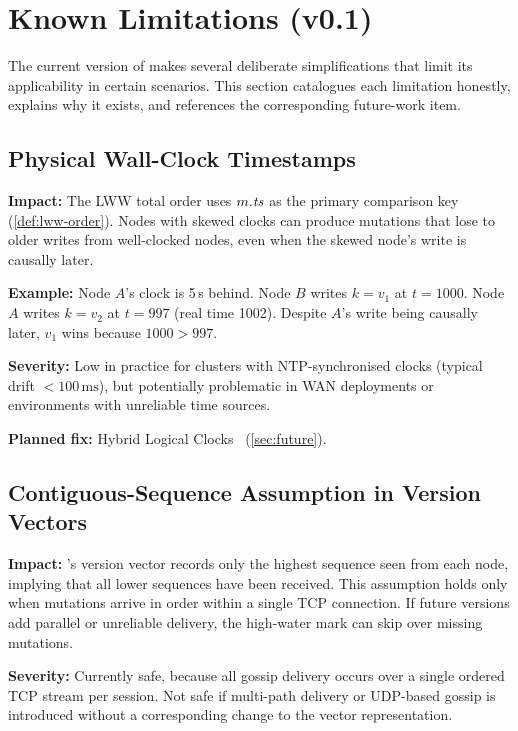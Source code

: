 \section{Known Limitations (v0.1)}
\label{sec:limitations}

The current version of \pebble{} makes several deliberate simplifications that
limit its applicability in certain scenarios. This section catalogues each
limitation honestly, explains why it exists, and references the corresponding
future-work item.

\subsection{Physical Wall-Clock Timestamps}

\textbf{Impact:} The LWW total order uses $m.\mathit{ts}$ as the primary comparison
key (\cref{def:lww-order}). Nodes with skewed clocks can produce mutations that
lose to older writes from well-clocked nodes, even when the skewed node's write
is causally later.

\textbf{Example:} Node $A$'s clock is 5\,s behind. Node $B$ writes $k = v_1$ at
$t = 1000$. Node $A$ writes $k = v_2$ at $t = 997$ (real time 1002). Despite
$A$'s write being causally later, $v_1$ wins because $1000 > 997$.

\textbf{Severity:} Low in practice for clusters with NTP-synchronised clocks
(typical drift $< 100\,\text{ms}$), but potentially problematic in WAN deployments
or environments with unreliable time sources.

\textbf{Planned fix:} Hybrid Logical Clocks~\cite{kulkarni2014hlc} (\cref{sec:future}).

\subsection{Contiguous-Sequence Assumption in Version Vectors}

\textbf{Impact:} \pebble{}'s version vector records only the highest sequence
seen from each node, implying that all lower sequences have been received.
This assumption holds only when mutations arrive in order within a single TCP
connection. If future versions add parallel or unreliable delivery, the
high-water mark can skip over missing mutations.

\textbf{Severity:} Currently safe, because all gossip delivery occurs over a
single ordered TCP stream per session. Not safe if multi-path delivery or
UDP-based gossip is introduced without a corresponding change to the vector
representation.

